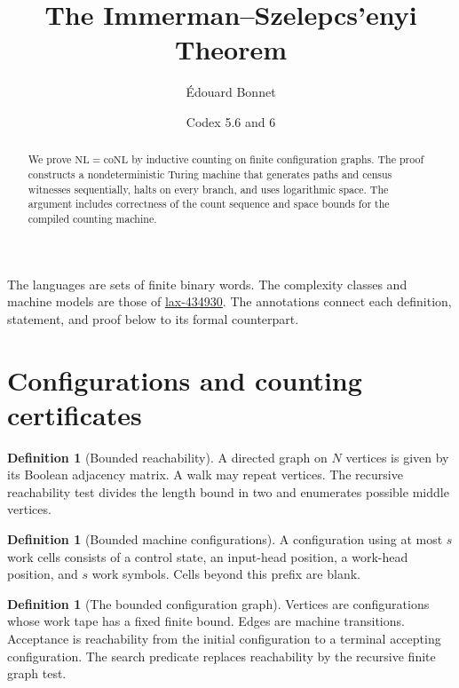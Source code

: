 \documentclass[11pt]{article}
\title{The Immerman--Szelepcs'enyi Theorem}
\author{\'{E}douard Bonnet \and Codex 5.6 and 6}
\date{}
\theoremstyle{definition}
\newtheorem{definition}[theorem]{Definition}
\begin{document}
\maketitle
\begin{abstract}
We prove $\mathrm{NL}=\mathrm{coNL}$ by inductive counting on finite configuration graphs. The proof constructs a nondeterministic Turing machine that generates paths and census witnesses sequentially, halts on every branch, and uses logarithmic space. The argument includes correctness of the count sequence and space bounds for the compiled counting machine.
\end{abstract}
The languages are sets of finite binary words. The complexity classes and
machine models are those of \href{https://laxarchive.org/lax-434930/}{lax-434930}.
The annotations connect each definition, statement, and proof below to its formal counterpart.

\section{Configurations and counting certificates}

\begin{definition}[Bounded reachability]\leavevmode
A directed graph on $N$ vertices is given by its Boolean adjacency matrix.
A walk may repeat vertices. The recursive reachability test divides the
length bound in two and enumerates possible middle vertices.

\end{definition}

\begin{definition}[Bounded machine configurations]\leavevmode
A configuration using at most $s$ work cells consists of a control state,
an input-head position, a work-head position, and $s$ work symbols.
Cells beyond this prefix are blank.

\end{definition}

\begin{definition}[The bounded configuration graph]\leavevmode
Vertices are configurations whose work tape has a fixed finite bound.
Edges are machine transitions. Acceptance is reachability from the initial
configuration to a terminal accepting configuration. The search predicate
replaces reachability by the recursive finite graph test.

\end{definition}
\end{document}
